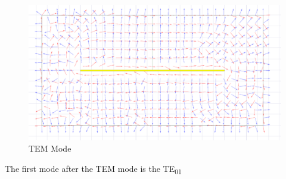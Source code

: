 \begin{figure}[h]
    \centering
    \includegraphics[width=0.5\linewidth]{images/tem_mode.png}
    \caption{TEM Mode}
    \label{fig:tem_mode}
\end{figure}

The first mode after the TEM mode is the TE\textsubscript{01}

